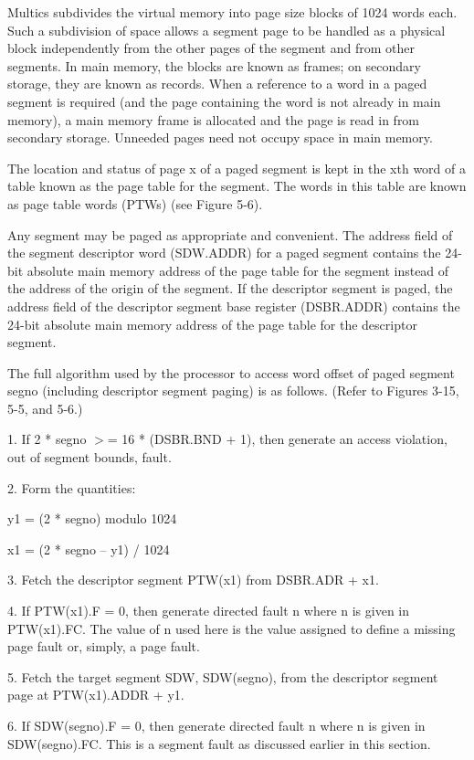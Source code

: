 Multics subdivides the virtual memory into page size blocks of 1024 words each.
Such a subdivision of space allows a segment page to be handled as a physical
block independently from the other pages of the segment and from other
segments. In main memory, the blocks are known as frames; on secondary storage,
they are known as records. When a reference to a word in a paged segment is
required (and the page containing the word is not already in main memory), a
main memory frame is allocated and the page is read in from secondary storage.
Unneeded pages need not occupy space in main memory.


The location and status of page x of a paged segment is kept in the xth word of
a table known as the page table for the segment. The words in this table are
known as page table words (PTWs) (see Figure 5-6).


Any segment may be paged as appropriate and convenient. The address field of
the segment descriptor word (SDW.ADDR) for a paged segment contains the 24-bit
absolute main memory address of the page table for the segment instead of the
address of the origin of the segment. If the descriptor segment is paged, the
address field of the descriptor segment base register (DSBR.ADDR) contains the
24-bit absolute main memory address of the page table for the descriptor
segment.


The full algorithm used by the processor to access word offset of paged segment
segno (including descriptor segment paging) is as follows. (Refer to Figures
3-15, 5-5, and 5-6.)


1. If 2 * segno $>$= 16 * (DSBR.BND + 1), then generate an access violation,
out of segment bounds, fault.


2. Form the quantities:


y1 = (2 * segno) modulo 1024

x1 = (2 * segno -- y1) / 1024

3. Fetch the descriptor segment PTW(x1) from DSBR.ADR + x1.

4. If PTW(x1).F = 0, then generate directed fault n where n is given in
PTW(x1).FC. The value of n used here is the value assigned to define a missing
page fault or, simply, a page fault.

5. Fetch the target segment SDW, SDW(segno), from the descriptor segment page
at PTW(x1).ADDR + y1.

6. If SDW(segno).F = 0, then generate directed fault n where n is given in
SDW(segno).FC.  This is a segment fault as discussed earlier in this section.

